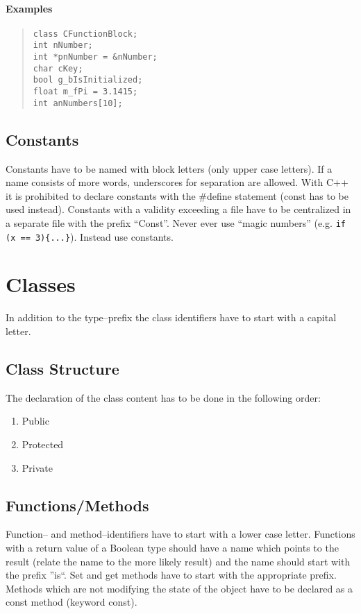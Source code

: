 \documentclass[final,a4paper,10pt, oneside]{article}
\begin{document}
\paragraph{Examples}
\begin{quote}
\verb|class CFunctionBlock;|\\
\verb|int nNumber;|\\
\verb|int *pnNumber = &nNumber;|\\
\verb|char cKey;|\\
\verb|bool g_bIsInitialized;|\\
\verb|float m_fPi = 3.1415;|\\
\verb|int anNumbers[10];|\\
\end{quote}


\subsection{Constants}
Constants have to be named with block letters (only upper case letters). If a name consists of more words, underscores for separation are
allowed. With C++ it is prohibited to declare constants with the \#define statement (const has to be used instead). Constants with a validity exceeding a file have to be centralized in a separate file with the prefix ``Const''. Never ever use ``magic numbers'' 
(e.g. \verb|if (x == 3){...}|). Instead use constants.




\section{Classes}
In addition to the type--prefix the class identifiers have to start with a capital letter.
\subsection{Class Structure}
 The declaration of the class content has to be done in the following order:
\begin{enumerate}
\item Public
\item Protected
\item Private
\end{enumerate}

\subsection{Functions/Methods}
Function-- and method--identifiers have to start with a lower case letter. Functions with a return value of a Boolean type should have a name which points to the result (relate the name to the more likely result) and the name should start with the prefix ''is``. Set and get methods have to start with the appropriate prefix. Methods which are not modifying the state of the object have to be declared as a const method (keyword const).
\end{document}
